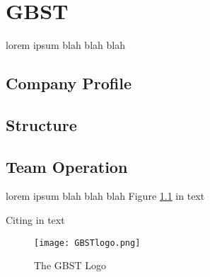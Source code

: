 \chapter{GBST}

lorem ipsum blah blah blah

\section{Company Profile}

\section{Structure}

\section{Team Operation}

lorem ipsum blah blah blah Figure \ref{gbstlogo} in text

Citing \cite{gbstlogo} in text

\vspace{0.5cm}
\begin{figure}[ht!]
\centering
\texttt{[image: GBSTlogo.png]}
\caption{The GBST Logo}
\label{gbstlogo}
\end{figure}

\begin{comment}
\texttt{[image: GBSTlogo.png]}
\end{comment}
